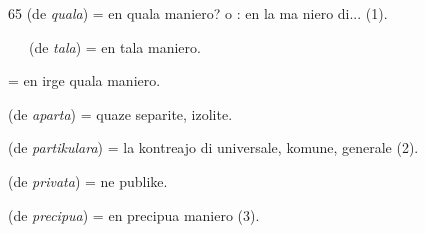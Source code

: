 \begin{VUpage}[69]{65}
 (de \textit{quala}) = en quala maniero? o : en la ma\cc
niero di... (1).

 \ \ \ (de \textit{tala}) = en tala maniero.

 = en irge quala maniero.

 (de \textit{aparta}) = quaze separite, izolite.

 (de \textit{partikulara}) = la kontreajo di universale,\nl
komune, generale (2).

 (de \textit{privata}) = ne publike.

 (de \textit{precipua}) = en precipua maniero (3).
\end{VUpage}

